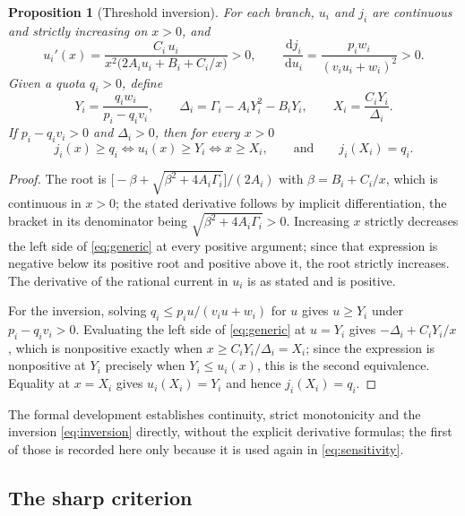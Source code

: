 \documentclass[11pt,a4paper]{article}
\theoremstyle{plain}
\newtheorem{proposition}[theorem]{Proposition}
\theoremstyle{definition}
\theoremstyle{remark}
\newcommand{\dd}{\,\mathrm d}
\newcommand{\Gm}{\Gamma}
\begin{document}
\begin{proposition}[Threshold inversion]\label{prop:threshold}
For each branch, $u_i$ and $j_i$ are continuous and strictly increasing on
$x>0$, and
\begin{equation}\label{eq:uprime}
  u_i'(x)=\frac{C_i\,u_i}{x^2\bigl(2A_iu_i+B_i+C_i/x\bigr)}>0,
  \qquad \frac{\dd j_i}{\dd u_i}=\frac{p_iw_i}{(v_iu_i+w_i)^2}>0 .
\end{equation}
Given a quota $q_i>0$, define
\begin{equation}\label{eq:thresholds}
  Y_i=\frac{q_iw_i}{p_i-q_iv_i},\qquad
  \Delta_i=\Gm_i-A_iY_i^2-B_iY_i,\qquad
  X_i=\frac{C_iY_i}{\Delta_i} .
\end{equation}
If $p_i-q_iv_i>0$ and $\Delta_i>0$, then for every $x>0$
\begin{equation}\label{eq:inversion}
  j_i(x)\ge q_i
  \iff u_i(x)\ge Y_i
  \iff x\ge X_i,
  \qquad\text{and}\qquad j_i(X_i)=q_i .
\end{equation}
\end{proposition}

\begin{proof}
The root is $\bigl[-\beta+\sqrt{\beta^2+4A_i\Gm_i}\bigr]/(2A_i)$ with
$\beta=B_i+C_i/x$, which is continuous in $x>0$; the stated derivative follows by
implicit differentiation, the bracket in its denominator being
$\sqrt{\beta^2+4A_i\Gm_i}>0$. Increasing $x$ strictly decreases the left side of
\eqref{eq:generic} at every positive argument; since that expression is negative
below its positive root and positive above it, the root strictly increases. The
derivative of the rational current in $u_i$ is as stated and is positive.

For the inversion, solving $q_i\le p_iu/(v_iu+w_i)$ for $u$ gives $u\ge Y_i$ under
$p_i-q_iv_i>0$. Evaluating the left side of \eqref{eq:generic} at $u=Y_i$ gives
$-\Delta_i+C_iY_i/x$, which is nonpositive exactly when $x\ge C_iY_i/\Delta_i=X_i$;
since the expression is nonpositive at $Y_i$ precisely when $Y_i\le u_i(x)$, this
is the second equivalence. Equality at $x=X_i$ gives $u_i(X_i)=Y_i$ and hence
$j_i(X_i)=q_i$.
\end{proof}

The formal development establishes continuity, strict monotonicity and the
inversion \eqref{eq:inversion} directly, without the explicit derivative
formulas; the first of those is recorded here only because it is used again in
\eqref{eq:sensitivity}.

\subsection{The sharp criterion}
\end{document}
